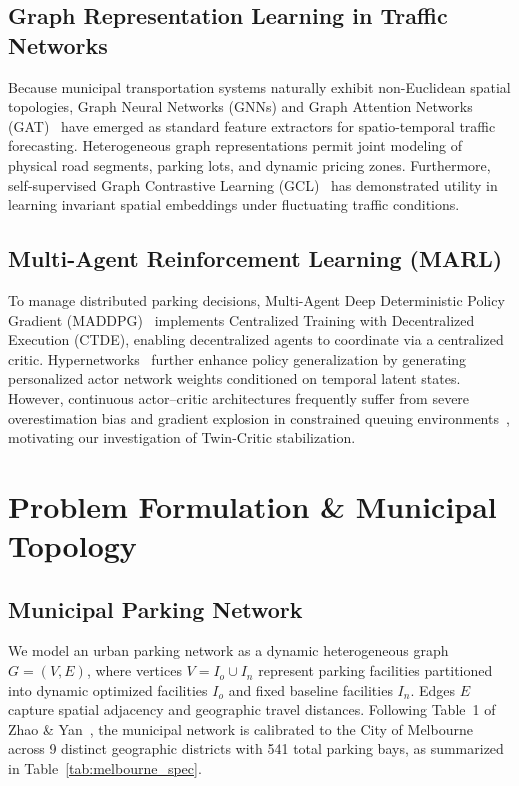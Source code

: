 \documentclass[journal]{IEEEtran}
\begin{document}
\subsection{Graph Representation Learning in Traffic Networks}
Because municipal transportation systems naturally exhibit non-Euclidean spatial topologies, Graph Neural Networks (GNNs) and Graph Attention Networks (GAT)~\cite{velickovic2018graph} have emerged as standard feature extractors for spatio-temporal traffic forecasting. Heterogeneous graph representations permit joint modeling of physical road segments, parking lots, and dynamic pricing zones. Furthermore, self-supervised Graph Contrastive Learning (GCL)~\cite{he2020momentum} has demonstrated utility in learning invariant spatial embeddings under fluctuating traffic conditions.

\subsection{Multi-Agent Reinforcement Learning (MARL)}
To manage distributed parking decisions, Multi-Agent Deep Deterministic Policy Gradient (MADDPG)~\cite{lowe2017multi} implements Centralized Training with Decentralized Execution (CTDE), enabling decentralized agents to coordinate via a centralized critic. Hypernetworks~\cite{ha2016hypernetworks} further enhance policy generalization by generating personalized actor network weights conditioned on temporal latent states. However, continuous actor--critic architectures frequently suffer from severe overestimation bias and gradient explosion in constrained queuing environments~\cite{fujimoto2018addressing,henderson2018deep,agarwal2021deep}, motivating our investigation of Twin-Critic stabilization.

\section{Problem Formulation \& Municipal Topology}

\subsection{Municipal Parking Network}
We model an urban parking network as a dynamic heterogeneous graph $G = (V, E)$, where vertices $V = I_o \cup I_n$ represent parking facilities partitioned into dynamic optimized facilities $I_o$ and fixed baseline facilities $I_n$. Edges $E$ capture spatial adjacency and geographic travel distances. Following Table~1 of Zhao \& Yan~\cite{zhao2025deep}, the municipal network is calibrated to the City of Melbourne across 9 distinct geographic districts with 541 total parking bays, as summarized in Table~\ref{tab:melbourne_spec}.
\end{document}
